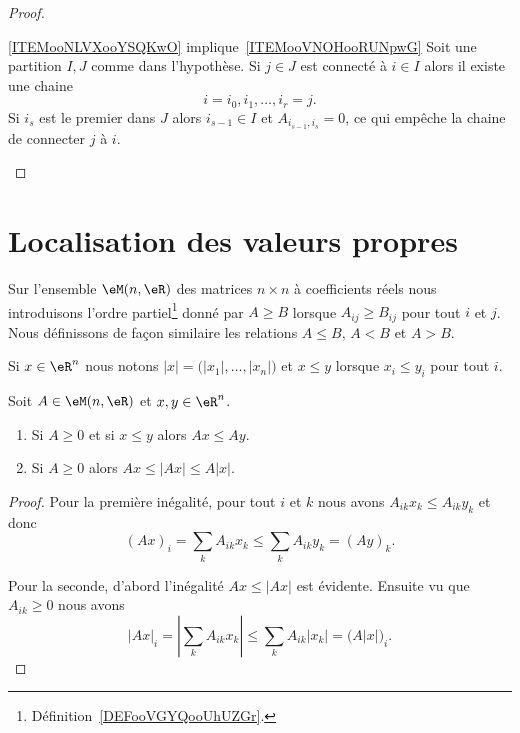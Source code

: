 \begin{proof}
\begin{subproof}
		\item[\ref{ITEMooNLVXooYSQKwO} implique~\ref{ITEMooVNOHooRUNpwG}]
		Soit une partition \( I,J\) comme dans l'hypothèse. Si \( j\in J\) est connecté à \( i\in I\) alors il existe une chaine
		\begin{equation}
			i=i_0,i_1,\ldots, i_r=j.
		\end{equation}
		Si \( i_s\) est le premier dans \( J\) alors \( i_{s-1}\in I\) et \( A_{i_{s-1},i_s}=0\), ce qui empêche la chaine de connecter \( j\) à \( i\).
	\end{subproof}
\end{proof}

\section{Localisation des valeurs propres}

Sur l'ensemble \( \eM(n,\eR)\) des matrices \( n\times n\) à coefficients réels nous introduisons l'ordre partiel\footnote{Définition~\ref{DEFooVGYQooUhUZGr}.} donné par \( A\geq B\) lorsque \( A_{ij}\geq B_{ij}\) pour tout \( i\) et \( j\). Nous définissons de façon similaire les relations \( A\leq B\), \( A<B\) et \( A>B\).

Si \( x\in \eR^n\) nous notons \( | x |=\big( | x_1 |,\ldots, | x_n | \big)\) et \( x\leq y\) lorsque \( x_i\leq y_i\) pour tout \( i\).

\begin{proposition}     \label{PROPooGVRVooZEvKcn}
	Soit \( A\in \eM(n,\eR)\) et \( x,y\in \eR^n\).
	\begin{enumerate}
		\item       \label{ITEMooXQOPooPVLjFh}
		      Si \( A\geq 0\) et si \( x\leq y\) alors \( Ax\leq Ay\).
		\item       \label{ITEMooQLCJooKIbws}
		      Si \( A\geq 0\) alors \( Ax\leq | Ax |\leq A| x |\).
	\end{enumerate}
\end{proposition}

\begin{proof}
	Pour la première inégalité, pour tout \( i\) et \( k\) nous avons \( A_{ik}x_k\leq A_{ik}y_k\) et donc
	\begin{equation}
		(Ax)_i=\sum_kA_{ik}x_k\leq \sum_kA_{ik}y_k=(Ay)_k.
	\end{equation}

	Pour la seconde, d'abord l'inégalité \( Ax\leq | Ax |\) est évidente. Ensuite vu que \( A_{ik}\geq 0\) nous avons
	\begin{equation}
		| Ax |_i=| \sum_kA_{ik}x_k |\leq \sum_kA_{ik}| x_k |=\big( A| x | \big)_i.
	\end{equation}
\end{proof}

